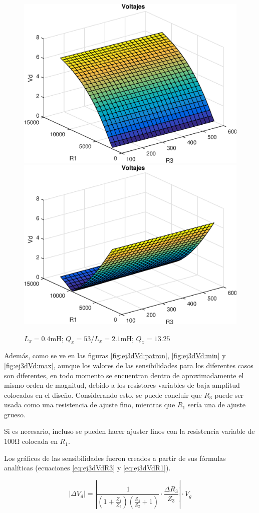     \begin{figure}[ht]
        \begin{center}
            \includegraphics[width=0.4\linewidth]{MATLAB/ej3Vdmin}
            \includegraphics[width=0.4\linewidth]{MATLAB/ej3Vdmax}
            \caption{$L_x=0.4\si{\milli\henry}$; $Q_x=53$/$L_x=2.1\si{\milli\henry}$; $Q_x=13.25$}
            \label{fig:ej3Vd:min-MAX}
        \end{center}
    \end{figure}

    Además, como se ve en las figuras \ref{fig:ej3dVd:patron}, \ref{fig:ej3dVd:min} y \ref{fig:ej3dVd:max}, 
    aunque los valores de las sensibilidades para los diferentes casos son diferentes, en todo
    momento se encuentran dentro de aproximadamente el mismo orden de magnitud, debido a los resistores
    variables de baja amplitud colocados en el diseño. Considerando esto, se puede concluir que $R_3$
    puede ser usada como una resistencia de ajuste fino, mientras que $R_1$ sería una de ajuste grueso.

    Si es necesario, incluso se pueden hacer ajuster finos con la resistencia variable de $100\si{\ohm}$
    colocada en $R_1$.

    Los gráficos de las sensibilidades fueron creados a partir de sus fórmulas analíticas (ecuaciones \ref{eq:ej3dVdR3} y \ref{eq:ej3dVdR1}).

    \begin{equation}
        |\Delta V_d| = \left| \frac{1}{(1+\frac{Z_1}{Z_3})(\frac{Z_4}{Z_2} + 1)} \cdot \frac{\Delta R_3}{Z_3} \right| \cdot V_g 
        \label{eq:ej3dVdR3}
    \end{equation}

